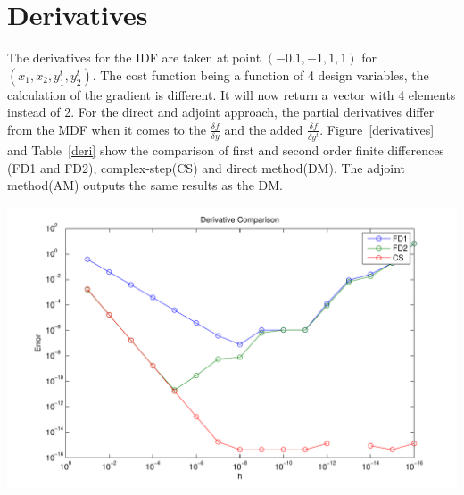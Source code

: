 \documentclass[letterpaper,12pt]{article}
\begin{document}
\section{Derivatives}

The derivatives for the IDF are taken at point $(-0.1,-1,1,1)$ for $(x_1,x_2,y_1^t,y_2^t)$. The cost function being a function of 4 design variables, the calculation of the gradient is different. It will now return a vector with 4 elements instead of 2. For the direct and adjoint approach, the partial derivatives differ from the MDF when it comes to the $\displaystyle\frac{\delta f}{ \delta y}$ and the added $\displaystyle\frac{\delta f}{ \delta y^t}$. Figure~\ref{derivatives} and Table~\ref{deri} show the comparison of first and second order finite differences (FD1 and FD2), complex-step(CS) and direct method(DM). The adjoint method(AM) outputs the same results as the DM.

\begin{center}
\includegraphics[scale=0.6]{derivatives}
\label{derivatives}
\end{center}
\end{document}
